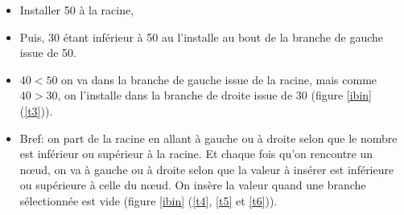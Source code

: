 \begin{itemize}
\item Installer 50 à la racine,
\item Puis, 30 étant inférieur à 50 au l'installe au bout de la branche
de gauche issue de 50.
\item $40 < 50$ on va dans la branche de gauche issue de la racine,
  mais comme $40>30$, on l'installe dans la branche de droite issue de
  $30$ (figure \ref{ibin} (\ref{t3})).
\item Bref: on part de la racine en allant à gauche ou à droite selon
  que le nombre est inférieur ou supérieur à la racine. Et chaque fois
  qu'on rencontre un n{\oe}ud, on va à gauche ou à droite selon que la
  valeur à insérer est inférieure ou supérieure à celle du
  n{\oe}ud. On insère la valeur quand une branche sélectionnée est vide
  (figure \ref{ibin} (\ref{t4}, \ref{t5} et \ref{t6})).
\end{itemize}
